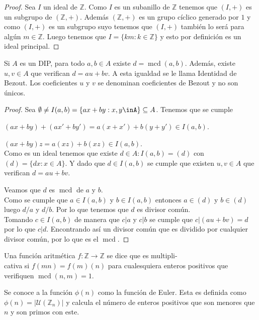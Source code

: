 \begin{proof}
		Sea $I$ un ideal de $\mathbb{Z}$. Como $I$ es un subanillo de $\mathbb{Z}$ tenemos que $(I,+)$ es un subgrupo de $(\mathbb{Z}, +)$. Además $(\mathbb{Z}, +)$ es un grupo cíclico generado por $1$ y como $(I,+)$ es un subgrupo suyo tenemos que $(I,+)$ también lo será para algún $m \in \mathbb{Z}$. Luego tenemos que $I=\{km:k\in\mathbb{Z}\}$ y esto por definición es un ideal principal.
\end{proof}
\begin{teorema}
		Si $A$ es un DIP, para todo $a,b\in A$ existe $d = \operatorname{mcd}(a,b)$. Además, existe $u,v \in A$ que verifican $d=au+bv$. A esta igualdad se le llama Identidad de Bezout. Los coeficientes $u$ y $v$ se denominan coeficientes de Bezout y no son únicos.
\end{teorema}
\begin{proof}
	Sea $\emptyset \neq I(a,b)=\{ax+by:x,y\inA\}\subseteq A$. Tenemos que se cumple\par
	 $(ax+by)+(ax'+by')=a(x+x')+b(y+y')\in I(a,b)$.\par
	 $(ax+by)z=a(xz)+b(xz)\in I(a,b)$.\\
	 Como es un ideal tenemos que existe $ d \in A:I(a,b)=(d)$ con $(d)=\{dx:x\in A\}$. Y dado que $d\in I(a,b)$ se cumple que existen $ u,v \in A$ que verifican $d=au+bv$.\par
	 Veamos que $d$ es $\operatorname{mcd}$ de $a$ y $b$.\\ Como se cumple que $a\in I(a,b)$ y $b\in I(a,b)$ entonces $a\in (d)$ y $b\in (d)$ luego $d/a$ y $d/b$. Por lo que tenemos que $d$ es divisor común.\\
	 Tomando $c\in I(a,b)$ de manera que $c|a$ y $c|b$ se cumple que $c|(au+bv)=d$ por lo que $c|d$. Encontrando así un divisor común que es dividido por cualquier divisor común, por lo que es el $\operatorname{mcd}$.
\end{proof}
\begin{definicion}
		Una función aritmética $f:\mathbb{Z}\rightarrow \mathbb{Z}$ se dice que es multipli-\\cativa si $f(mn)=f(m)(n)$ para cualesquiera enteros positivos que verifiquen $\operatorname{mcd}(n,m)=1$.
\end{definicion}
\begin{definicion}
		Se conoce a la función $\phi(n)$ como la función de Euler. Esta es definida como $\phi(n)=|\mathcal{U}(\mathbb{Z}_n)|$ y calcula el número de enteros positivos que son menores que $n$ y son primos con este. 
\end{definicion}

